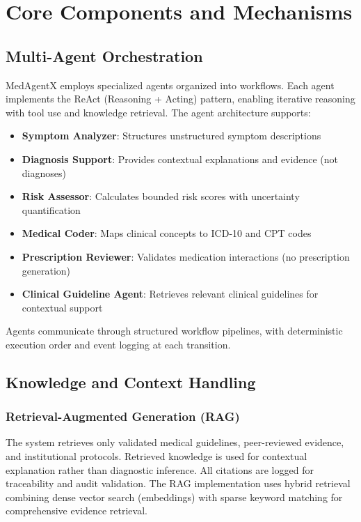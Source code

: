\documentclass[conference]{IEEEtran}
\begin{document}
\section{Core Components and Mechanisms}

\subsection{Multi-Agent Orchestration}
MedAgentX employs specialized agents organized into workflows. Each agent implements the ReAct (Reasoning + Acting) pattern, enabling iterative reasoning with tool use and knowledge retrieval. The agent architecture supports:

\begin{itemize}
    \item \textbf{Symptom Analyzer}: Structures unstructured symptom descriptions
    \item \textbf{Diagnosis Support}: Provides contextual explanations and evidence (not diagnoses)
    \item \textbf{Risk Assessor}: Calculates bounded risk scores with uncertainty quantification
    \item \textbf{Medical Coder}: Maps clinical concepts to ICD-10 and CPT codes
    \item \textbf{Prescription Reviewer}: Validates medication interactions (no prescription generation)
    \item \textbf{Clinical Guideline Agent}: Retrieves relevant clinical guidelines for contextual support
\end{itemize}

Agents communicate through structured workflow pipelines, with deterministic execution order and event logging at each transition.

\subsection{Knowledge and Context Handling}

\subsubsection{Retrieval-Augmented Generation (RAG)}
The system retrieves only validated medical guidelines, peer-reviewed evidence, and institutional protocols. Retrieved knowledge is used for contextual explanation rather than diagnostic inference. All citations are logged for traceability and audit validation. The RAG implementation uses hybrid retrieval combining dense vector search (embeddings) with sparse keyword matching for comprehensive evidence retrieval.
\end{document}
